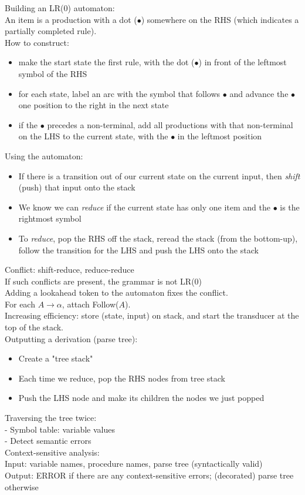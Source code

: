 \documentclass[12pt]{article}
\begin{document}
\noindent
Building an LR(0) automaton:\\
An item is a production with a dot ($\bullet$) somewhere on the RHS (which indicates a partially completed rule).\\
How to construct:
\begin{itemize}
	\renewcommand\labelitemi{--}
	\item make the start state the first rule, with the dot ($\bullet$) in front of the leftmost symbol of the RHS
	\item for each state, label an arc with the symbol that follows $\bullet$ and advance the $\bullet$ one position to the right in the next state
	\item if the $\bullet$ precedes a non-terminal, add all productions with that non-terminal on the LHS to the current state, with the $\bullet$ in the leftmost position
\end{itemize}
Using the automaton:
\begin{itemize}
	\renewcommand\labelitemi{--}
	\item If there is a transition out of our current state on the current input, then \emph{shift} (push) that input onto the stack
	\item We know we can \emph{reduce} if the current state has only one item and the $\bullet$ is the rightmost symbol
	\item To \emph{reduce}, pop the RHS off the stack, reread the stack (from the bottom-up), follow the transition for the LHS and push the LHS onto the stack
\end{itemize}
Conflict: shift-reduce, reduce-reduce\\
If such conflicts are present, the grammar is not LR(0)\\
Adding a lookahead token to the automaton fixes the conflict.\\
For each $A \rightarrow \alpha$, attach Follow($A$).\\
Increasing efficiency: store (state, input) on stack, and start the transducer at the top of the stack.\\

\clearpage
Outputting a derivation (parse tree):
\begin{itemize}
	\renewcommand\labelitemi{--}
	\item Create a "tree stack"
	\item Each time we reduce, pop the RHS nodes from tree stack
	\item Push the LHS node and make its children the nodes we just popped
\end{itemize}
Traversing the tree twice:\\
- Symbol table: variable values\\
- Detect semantic errors\\
Context-sensitive analysis:\\
Input: variable names, procedure names, parse tree (syntactically valid)\\
Output: ERROR if there are any context-sensitive errors; (decorated) parse tree otherwise
\end{document}
